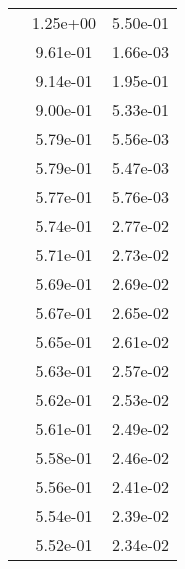 \begin{table}
\begin{tabular}{c|cc|}
\multicolumn{1}{|c|}{} & \multicolumn{1}{|c|}{  1.25e+00} & \multicolumn{1}{|c|}{  5.50e-01} \\ 
\multicolumn{1}{|c|}{} & \multicolumn{1}{|c|}{  9.61e-01} & \multicolumn{1}{|c|}{  1.66e-03} \\ 
\multicolumn{1}{|c|}{} & \multicolumn{1}{|c|}{  9.14e-01} & \multicolumn{1}{|c|}{  1.95e-01} \\ 
\multicolumn{1}{|c|}{} & \multicolumn{1}{|c|}{  9.00e-01} & \multicolumn{1}{|c|}{  5.33e-01} \\ 
\multicolumn{1}{|c|}{} & \multicolumn{1}{|c|}{  5.79e-01} & \multicolumn{1}{|c|}{  5.56e-03} \\ 
\multicolumn{1}{|c|}{} & \multicolumn{1}{|c|}{  5.79e-01} & \multicolumn{1}{|c|}{  5.47e-03} \\ 
\multicolumn{1}{|c|}{} & \multicolumn{1}{|c|}{  5.77e-01} & \multicolumn{1}{|c|}{  5.76e-03} \\ 
\multicolumn{1}{|c|}{} & \multicolumn{1}{|c|}{  5.74e-01} & \multicolumn{1}{|c|}{  2.77e-02} \\ 
\multicolumn{1}{|c|}{} & \multicolumn{1}{|c|}{  5.71e-01} & \multicolumn{1}{|c|}{  2.73e-02} \\ 
\multicolumn{1}{|c|}{} & \multicolumn{1}{|c|}{  5.69e-01} & \multicolumn{1}{|c|}{  2.69e-02} \\ 
\multicolumn{1}{|c|}{} & \multicolumn{1}{|c|}{  5.67e-01} & \multicolumn{1}{|c|}{  2.65e-02} \\ 
\multicolumn{1}{|c|}{} & \multicolumn{1}{|c|}{  5.65e-01} & \multicolumn{1}{|c|}{  2.61e-02} \\ 
\multicolumn{1}{|c|}{} & \multicolumn{1}{|c|}{  5.63e-01} & \multicolumn{1}{|c|}{  2.57e-02} \\ 
\multicolumn{1}{|c|}{} & \multicolumn{1}{|c|}{  5.62e-01} & \multicolumn{1}{|c|}{  2.53e-02} \\ 
\multicolumn{1}{|c|}{} & \multicolumn{1}{|c|}{  5.61e-01} & \multicolumn{1}{|c|}{  2.49e-02} \\ 
\multicolumn{1}{|c|}{} & \multicolumn{1}{|c|}{  5.58e-01} & \multicolumn{1}{|c|}{  2.46e-02} \\ 
\multicolumn{1}{|c|}{} & \multicolumn{1}{|c|}{  5.56e-01} & \multicolumn{1}{|c|}{  2.41e-02} \\ 
\multicolumn{1}{|c|}{} & \multicolumn{1}{|c|}{  5.54e-01} & \multicolumn{1}{|c|}{  2.39e-02} \\ 
\multicolumn{1}{|c|}{} & \multicolumn{1}{|c|}{  5.52e-01} & \multicolumn{1}{|c|}{  2.34e-02} \\ 

\end{tabular}
\end{table}
